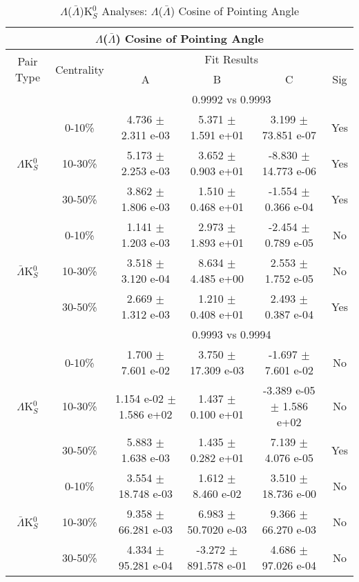 \documentclass[../AnalysisNoteJBuxton.tex]{subfiles}
\begin{document}
\begin{table}
 \centering
 \begin{tabular}{|c|c|c|c|c|c|}
  \multicolumn{6}{c}{$\Lambda$($\bar{\Lambda}$) Cosine of Pointing Angle} \\
  \hline
  \multirow{2}{*}{Pair Type} & \multirow{2}{*}{Centrality} & \multicolumn{4}{c|}{Fit Results} \\
  \cline{3-6}
   & & A & B & C & Sig \\  
  \hline
  \multicolumn{2}{|c}{} & \multicolumn{4}{c|}{0.9992 vs 0.9993} \\  
  \hline  
  \multirow{3}{*}{$\Lambda$K$^{0}_{S}$}
   &  0-10\% & 4.736 $\pm$ 2.311 e-03 & 5.371 $\pm$ 1.591 e+01 & 3.199 $\pm$ 73.851 e-07 & Yes \\
   & 10-30\% & 5.173 $\pm$ 2.253 e-03 & 3.652 $\pm$ 0.903 e+01 & -8.830 $\pm$ 14.773 e-06 & Yes \\
   & 30-50\% & 3.862 $\pm$ 1.806 e-03 & 1.510 $\pm$ 0.468 e+01 & -1.554 $\pm$ 0.366 e-04 & Yes \\
  \hline
  \multirow{3}{*}{$\bar{\Lambda}$K$^{0}_{S}$}  
   &  0-10\% & 1.141 $\pm$ 1.203 e-03 & 2.973 $\pm$ 1.893 e+01 & -2.454 $\pm$ 0.789 e-05 & No \\
   & 10-30\% & 3.518 $\pm$ 3.120 e-04 & 8.634 $\pm$ 4.485 e+00 & 2.553 $\pm$ 1.752 e-05 & No \\
   & 30-50\% & 2.669 $\pm$ 1.312 e-03 & 1.210 $\pm$ 0.408 e+01 & 2.493 $\pm$ 0.387 e-04 & Yes \\
  \hline 
  \multicolumn{2}{|c}{} & \multicolumn{4}{c|}{0.9993 vs 0.9994} \\
  \hline  
  \multirow{3}{*}{$\Lambda$K$^{0}_{S}$}   
   &  0-10\% & 1.700 $\pm$ 7.601 e-02 & 3.750 $\pm$ 17.309 e-03 & -1.697 $\pm$ 7.601 e-02 & No \\
   & 10-30\% & 1.154 e-02 $\pm$ 1.586 e+02 & 1.437 $\pm$ 0.100 e+01 & -3.389 e-05 $\pm$ 1.586 e+02 & No \\
   & 30-50\% & 5.883 $\pm$ 1.638 e-03 & 1.435 $\pm$ 0.282 e+01 & 7.139 $\pm$ 4.076 e-05 & Yes \\
  \hline  
  \multirow{3}{*}{$\bar{\Lambda}$K$^{0}_{S}$}
   &  0-10\% & 3.554 $\pm$ 18.748 e-03 & 1.612 $\pm$ 8.460 e-02 & 3.510 $\pm$ 18.736 e-00 & No \\
   & 10-30\% & 9.358 $\pm$ 66.281 e-03 & 6.983 $\pm$ 50.7020 e-03 & 9.366 $\pm$ 66.270 e-03 & No \\
   & 30-50\% & 4.334 $\pm$ 95.281 e-04 & -3.272 $\pm$ 891.578 e-01 & 4.686 $\pm$ 97.026 e-04 & No \\
  \hline
 \end{tabular}
 \caption{$\Lambda$($\bar{\Lambda}$)K$^{0}_{S}$ Analyses: $\Lambda$($\bar{\Lambda}$) Cosine of Pointing Angle}
 \label{tab:LamCosPointingAngleLamK0Full}
\end{table}
\end{document}
